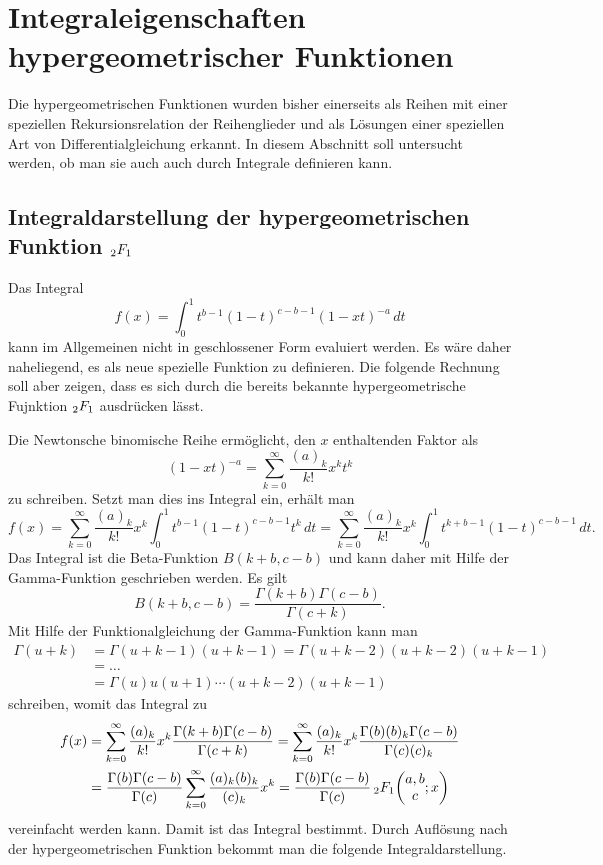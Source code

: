 %
%
%
\section{Integraleigenschaften hypergeometrischer Funktionen
\label{buch:integral:section:eulertransformation}}
Die hypergeometrischen Funktionen wurden bisher einerseits
als Reihen mit einer speziellen Rekursionsrelation der Reihenglieder
und als Lösungen einer speziellen Art von Differentialgleichung
erkannt.
In diesem Abschnitt soll untersucht werden, ob man sie auch
auch durch Integrale definieren kann.

%
%
\subsection{Integraldarstellung der hypergeometrischen Funktion
$\mathstrut_2F_1$}
Das Integral
\[
f(x)
=
\int_0^1 t^{b-1} (1-t)^{c-b-1} (1-xt)^{-a}\,dt
\]
kann im Allgemeinen nicht in geschlossener Form evaluiert werden.
Es wäre daher naheliegend, es als neue spezielle Funktion zu definieren.
Die folgende Rechnung soll aber zeigen, dass es sich durch die bereits
bekannte hypergeometrische Fujnktion $\mathstrut_2F_1$ ausdrücken
lässt.

Die Newtonsche binomische Reihe ermöglicht, den $x$ enthaltenden
Faktor als
\[
(1-xt)^{-a}
=
\sum_{k=0}^\infty
\frac{(a)_k}{k!} x^k t^k
\]
zu schreiben.
Setzt man dies ins Integral ein, erhält man
\[
f(x)
=
\sum_{k=0}^\infty \frac{(a)_k}{k!} x^k
\int_0^1 t^{b-1} (1-t)^{c-b-1} t^k\,dt
=
\sum_{k=0}^\infty \frac{(a)_k}{k!} x^k
\int_0^1 t^{k+b-1} (1-t)^{c-b-1}\,dt.
\]
Das Integral ist die Beta-Funktion $B(k+b,c-b)$ und kann daher mit Hilfe
der Gamma-Funktion geschrieben werden.
Es gilt
\[
B(k+b,c-b)
=
\frac{\Gamma(k+b)\Gamma(c-b)}{\Gamma(c+k)}.
\]
Mit Hilfe der Funktionalgleichung der Gamma-Funktion kann man
\begin{align*}
\Gamma(u+k)
&=
\Gamma(u+k-1) (u+k-1)
=
\Gamma(u+k-2) (u+k-2)(u+k-1)
\\
&=
\ldots
\\
&=
\Gamma(u) u(u+1)\cdots(u+k-2)(u+k-1)
\end{align*}
schreiben, womit das Integral zu
\begin{align*}
f(x)
&=
\sum_{k=0}^\infty \frac{(a)_k}{k!} x^k
\frac{\Gamma(k+b)\Gamma(c-b)}{\Gamma(c+k)}
=
\sum_{k=0}^\infty \frac{(a)_k}{k!} x^k
\frac{\Gamma(b)(b)_k\Gamma(c-b)}{\Gamma(c)(c)_k}
\\
&=
\frac{\Gamma(b)\Gamma(c-b)}{\Gamma(c)}
\sum_{k=0}^\infty\frac{(a)_k(b)_k}{(c)_k} x^k
=
\frac{\Gamma(b)\Gamma(c-b)}{\Gamma(c)}\,
\mathstrut_2F_1\biggl(\begin{matrix}a,b\\c\end{matrix};x\biggr)
\end{align*}
vereinfacht werden kann.
Damit ist das Integral bestimmt. 
Durch Auflösung nach der hypergeometrischen Funktion bekommt man
die folgende Integraldarstellung.

